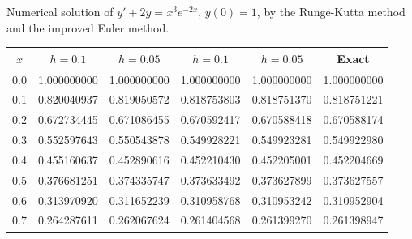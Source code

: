 \begin{examplesolution}
\begin{newtable}
  \label{table:3.3.1} Numerical solution of $y'+2y=x^{3}e^{-2x}$, $y(0)=1$, by the Runge-Kutta
  method and the improved Euler method.
  \begin{center}
    \begin{tabular}{|c|r|r|r|r|r|}
      \hline
      \multicolumn{1}{|c|}{$x$} & \multicolumn{1}{|c|}{$h=0.1$}       & \multicolumn{1}{|c|}{$h=0.05$}   & \multicolumn{1}{|c|}{$h=0.1$} & \multicolumn{1}{|c|}{$h=0.05$} & \multicolumn{1}{|c|}{Exact} \\
      \hline
      0.0                       & 1.000000000                         & 1.000000000                      & 1.000000000                   & 1.000000000                    & 1.000000000                 \\
      0.1                       & 0.820040937                         & 0.819050572                      & 0.818753803                   & 0.818751370                    & 0.818751221                 \\
      0.2                       & 0.672734445                         & 0.671086455                      & 0.670592417                   & 0.670588418                    & 0.670588174                 \\
      0.3                       & 0.552597643                         & 0.550543878                      & 0.549928221                   & 0.549923281                    & 0.549922980                 \\
      0.4                       & 0.455160637                         & 0.452890616                      & 0.452210430                   & 0.452205001                    & 0.452204669                 \\
      0.5                       & 0.376681251                         & 0.374335747                      & 0.373633492                   & 0.373627899                    & 0.373627557                 \\
      0.6                       & 0.313970920                         & 0.311652239                      & 0.310958768                   & 0.310953242                    & 0.310952904                 \\
      0.7                       & 0.264287611                         & 0.262067624                      & 0.261404568                   & 0.261399270                    & 0.261398947                 \\

\end{tabular}
\end{center}
\end{newtable}
\end{examplesolution}
